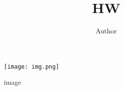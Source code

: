 \documentclass{article}
\title{HW}
\author{Author}
\date{\parbox{\linewidth}{\centering%
  Date: \today \\
  Course id: course id\\
  Course name: Course name\\
  SID: sid \\
  Name: Author}}
\begin{document}
\maketitle
\tableofcontents
{}
\pagebreak

\begin{figure}[H]
    \centering
    \texttt{[image: img.png]}
    \caption{image}
    \label{fig:enter-label}
\end{figure}

\inputminted[linenos, breaklines]{console}{output.txt}
\end{document}
